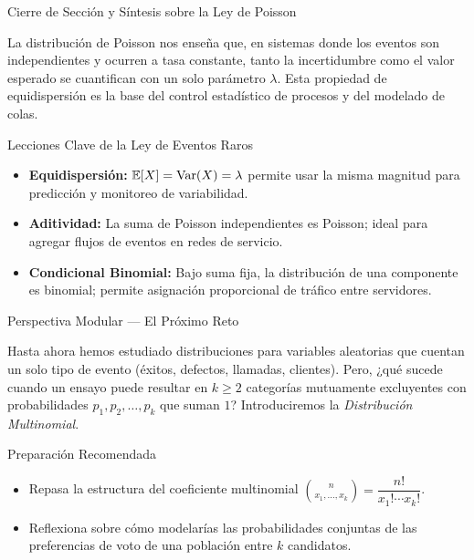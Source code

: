 \documentclass[10pt, aspectratio=169]{beamer}
\begin{document}
\begin{frame}{Cierre de Sección y Síntesis sobre la Ley de Poisson}
  \begin{reflexion}
    La distribución de Poisson nos enseña que, en sistemas donde los eventos son independientes y ocurren a tasa constante, tanto la incertidumbre como el valor esperado se cuantifican con un solo parámetro $\lambda$. Esta propiedad de equidispersión es la base del control estadístico de procesos y del modelado de colas.
  \end{reflexion}

  \vspace{0.15cm}
  \pause
  \begin{block}{Lecciones Clave de la Ley de Eventos Raros}
    \begin{itemize}\itemsep=0.08cm
      \item \textbf{Equidispersión:} $\mathbb{E}[X] = \operatorname{Var}(X) = \lambda$ permite usar la misma magnitud para predicción y monitoreo de variabilidad.
      \item \textbf{Aditividad:} La suma de Poisson independientes es Poisson; ideal para agregar flujos de eventos en redes de servicio.
      \item \textbf{Condicional Binomial:} Bajo suma fija, la distribución de una componente es binomial; permite asignación proporcional de tráfico entre servidores.
    \end{itemize}
  \end{block}
\end{frame}

\begin{frame}{Perspectiva Modular --- El Próximo Reto}
  \scriptsize
  \begin{retoclase}
    Hasta ahora hemos estudiado distribuciones para variables aleatorias que cuentan un solo tipo de evento (éxitos, defectos, llamadas, clientes). Pero, ¿qué sucede cuando un ensayo puede resultar en $k \ge 2$ categorías mutuamente excluyentes con probabilidades $p_{1}, p_{2}, \dots, p_{k}$ que suman $1$? Introduciremos la \emph{Distribución Multinomial}.
  \end{retoclase}

  \vspace{0.08cm}
  \pause
  \begin{alertblock}{Preparación Recomendada}
    \begin{itemize}\itemsep=0.06cm
      \item Repasa la estructura del coeficiente multinomial $\binom{n}{x_{1}, \dots, x_{k}} = \dfrac{n!}{x_{1}! \cdots x_{k}!}$.
      \item Reflexiona sobre cómo modelarías las probabilidades conjuntas de las preferencias de voto de una población entre $k$ candidatos.
    \end{itemize}
  \end{alertblock}
\end{frame}
\end{document}
